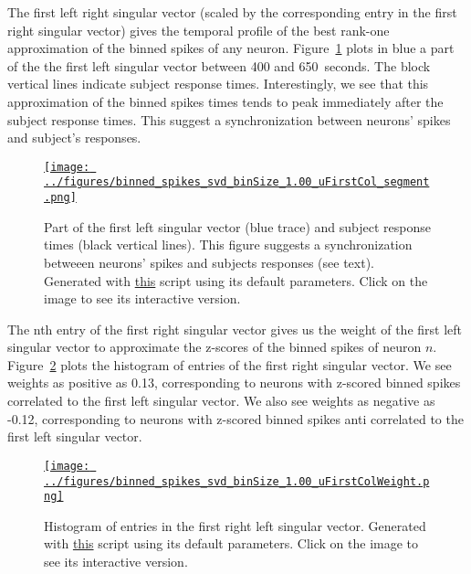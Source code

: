 \documentclass[12pt]{article}
\begin{document}
The first left right singular vector (scaled by the corresponding entry in the
first right singular vector) gives the temporal profile of the best rank-one approximation of the
binned spikes of any neuron.
%
Figure~\ref{fig:firstLeftSingularVector} plots in blue a part of the the first
left singular vector between 400 and 650~seconds. The block vertical lines
indicate subject response times. Interestingly, we see that this approximation
of the binned spikes times tends to peak immediately after the subject response
times. This suggest a synchronization between neurons' spikes and subject's
responses.

\begin{figure}[H]
    \begin{center}
        \href{https://www.gatsby.ucl.ac.uk/~rapela/neuroinformatics/2023/ws5/figures/binned_spikes_svd_binSize_1.00_uFirstCol.html}{\texttt{[image: ../figures/binned\_spikes\_svd\_binSize\_1.00\_uFirstCol\_segment.png]}}

        \caption{Part of the first left singular vector (blue trace) and subject response times
        (black vertical lines). This figure suggests a synchronization betweeen
        neurons' spikes and subjects responses (see text).
        Generated with
        \href{https://github.com/joacorapela/neuroinformatics23/blob/master/worksheets/ws5/mySolution/code/scripts/doEx2Plotly.py}{this}
        script using its default parameters. Click on the image to see its
        interactive version.}

        \label{fig:firstLeftSingularVector}
    \end{center}
\end{figure}


The nth entry of the first right singular vector gives us the weight of the
first left singular vector to approximate the z-scores of the binned spikes of
neuron $n$.  Figure~\ref{fig:histEntriesFirstRightSingularVector} plots the
histogram of entries of the first right singular vector. We see
weights as positive as 0.13, corresponding to neurons with z-scored binned
spikes correlated to the first left singular vector. We also see weights
as negative as -0.12, corresponding to neurons with z-scored binned spikes anti
correlated to the first left singular vector.

\begin{figure}[H]
    \begin{center}
        \href{https://www.gatsby.ucl.ac.uk/~rapela/neuroinformatics/2023/ws5/figures/binned_spikes_svd_binSize_1.00_uFirstColWeight.html}{\texttt{[image: ../figures/binned\_spikes\_svd\_binSize\_1.00\_uFirstColWeight.png]}}

        \caption{Histogram of entries in the first right left singular vector.
        Generated with
        \href{https://github.com/joacorapela/neuroinformatics23/blob/master/worksheets/ws5/mySolution/code/scripts/doEx2Plotly.py}{this}
        script using its default parameters. Click on the image to see its
        interactive version.}

        \label{fig:histEntriesFirstRightSingularVector}
    \end{center}
\end{figure}
\end{document}
